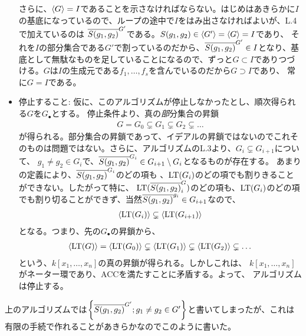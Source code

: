\documentclass[9pt]{ltjsarticle}
\begin{document}
\begin{myproof}
\begin{itemize}
  さらに、$\left\langle G \right\rangle = I$であることを示さなければならない。はじめはあきらかに$I$の基底になっているので、ループの途中で$I$をはみ出さなければよいが、L.4で加えているのは
  $\overline{S(g_1,g_2)}^{G'}$である。$S(g_1,g_2) \in \left\langle G' \right\rangle = \left\langle G \right\rangle = I$であり、
  それを$I$の部分集合である$G'$で割っているのだから、$\overline{S(g_1,g_2)}^{G'}\in I$となり、基底として無駄なものを足していることになるので、ずっと$G\subset I$でありつづける。$G$は$I$の生成元である$f_1,\dots,f_s$を含んでいるのだから$G\supset I$であり、
  常に$G=I$である。
  \item 停止すること:
  仮に、このアルゴリズムが停止しなかったとし、順次得られる$G$を$G_\bullet$とする。
  停止条件より、真の{\textit 部分集合の}昇鎖
  \begin{align}
    G = G_0 \subsetneq G_1 \subsetneq G_2 \subsetneq \dots
  \end{align}
  が得られる。部分集合の昇鎖であって、イデアルの昇鎖ではないのでこれそのものは問題ではない。さらに、アルゴリズムのL.3より、$G_i \subsetneq G_{i+1}$について、
  $g_1\neq g_2 \in G_i$で、$\overline{S(g_1,g_2)}^{G_i} \in G_{i+1}\setminus G_i$となるものが存在する。 あまりの定義により、$\overline{S(g_1,g_2)}^{G_i}$のどの項も
  、${\rm LT}(G_i)$のどの項でも割りきることができない。したがって特に、
  ${\rm LT}(\overline{S(g_1,g_2)}^{G}_i)$のどの項も、${\rm LT}(G_i)$のどの項でも割り切ることができず、当然$\overline{S(g_1,g_2)}^{g_i} \in G_{i+1}$なので、
  \begin{align}
    \left\langle {\rm LT}(G_i) \right\rangle \subsetneq \left\langle {\rm LT}(G_{i+1}) \right\rangle
  \end{align}
  となる。つまり、先の$G_\bullet$の昇鎖から、
  \begin{align}
    \left\langle {\rm LT}(G)  \right\rangle = \left\langle {\rm LT}(G_0)  \right\rangle \subsetneq \left\langle {\rm LT}(G_1) \right\rangle \subsetneq
    \left\langle {\rm LT}(G_2) \right\rangle \subsetneq \dots
  \end{align}
  という、$k[x_1,\dots,x_n]$の真の昇鎖が得られる。しかしこれは、
  $k[x_1,\dots,x_n]$がネーター環であり、ACCを満たすことに矛盾する。よって、
  アルゴリズムは停止する。
\end{itemize}
\end{myproof}

上のアルゴリズムでは$\left\{\overline{S(g_1,g_2)}^{G'} ; g_1\neq g_2 \in G'\right\}$と書いてしまったが、これは有限の手続で作れることがあきらかなのでこのように書いた。
\end{document}
